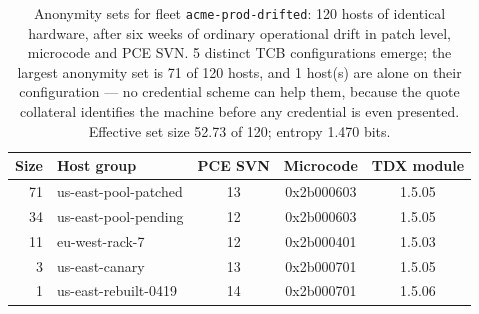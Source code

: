 \begin{table}[h]
\centering\small
\begin{tabular}{rlccc}
\toprule
Size & Host group & PCE SVN & Microcode & TDX module \\
\midrule
71 & us-east-pool-patched & 13 & 0x2b000603 & 1.5.05 \\
34 & us-east-pool-pending & 12 & 0x2b000603 & 1.5.05 \\
11 & eu-west-rack-7 & 12 & 0x2b000401 & 1.5.03 \\
3 & us-east-canary & 13 & 0x2b000701 & 1.5.05 \\
1 & us-east-rebuilt-0419 & 14 & 0x2b000701 & 1.5.06 \\
\bottomrule
\end{tabular}
\caption{Anonymity sets for fleet \texttt{acme-prod-drifted}: 120 hosts of identical hardware, after six weeks of ordinary operational drift in patch level, microcode and PCE SVN. 5 distinct TCB configurations emerge; the largest anonymity set is 71 of 120 hosts, and 1 host(s) are alone on their configuration --- no credential scheme can help them, because the quote collateral identifies the machine before any credential is even presented. Effective set size 52.73 of 120; entropy 1.470 bits.}
\label{tab:anonymity}
\end{table}
